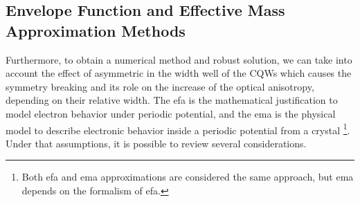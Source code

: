 \subsection{Envelope Function and Effective Mass Approximation Methods}
\label{subsec:chapter-2-efa-and-ema}
\vspace{-10mm} 
Furthermore, to obtain a numerical method and robust solution, we can take into account
the effect of asymmetric in the width well of the \gls{CQWs} which causes the symmetry breaking
and its role on the increase of the optical anisotropy, depending on their relative width. The \gls{efa} is the mathematical justification to model electron behavior under periodic potential, and the \gls{ema} is the physical
model to describe electronic behavior inside a periodic potential from a crystal \cite{harrison2016quantum}\footnote{Both \gls{efa} and \gls{ema} approximations are considered the same approach, but \gls{ema} depends on the formalism of \gls{efa}.}.
Under that assumptions, it is possible to review several considerations.
